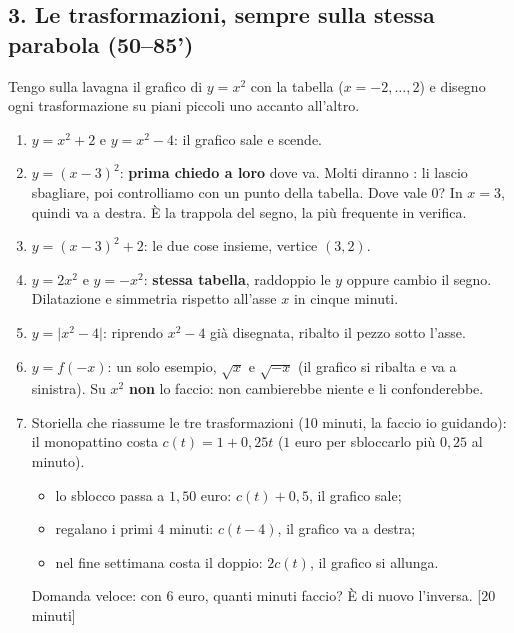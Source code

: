 \documentclass[11pt]{report}
\begin{document}
\subsection*{3. Le trasformazioni, sempre sulla stessa parabola (50--85')}
Tengo sulla lavagna il grafico di $y=x^2$ con la tabella ($x=-2,\dots,2$) e disegno ogni trasformazione su piani piccoli uno accanto all'altro.
\begin{enumerate}
  \item $y=x^2+2$ e $y=x^2-4$: il grafico sale e scende.
  \item $y=(x-3)^2$: \textbf{prima chiedo a loro} dove va. Molti diranno : li lascio sbagliare, poi controlliamo con un punto della tabella. Dove vale $0$? In $x=3$, quindi va a destra. È la trappola del segno, la più frequente in verifica.
  \item $y=(x-3)^2+2$: le due cose insieme, vertice $(3,2)$.
  \item $y=2x^2$ e $y=-x^2$: \textbf{stessa tabella}, raddoppio le $y$ oppure cambio il segno. Dilatazione e simmetria rispetto all'asse $x$ in cinque minuti.
  \item $y=\lvert x^2-4\rvert$: riprendo $x^2-4$ già disegnata, ribalto il pezzo sotto l'asse.
  \item $y=f(-x)$: un solo esempio, $\sqrt x$ e $\sqrt{-x}$ (il grafico si ribalta e va a sinistra). Su $x^2$ \textbf{non} lo faccio: non cambierebbe niente e li confonderebbe.
  \item Storiella che riassume le tre trasformazioni (10 minuti, la faccio io guidando): il monopattino costa $c(t)=1+0{,}25t$ ($1$ euro per sbloccarlo più $0{,}25$ al minuto).
  \begin{itemize}
    \item lo sblocco passa a $1{,}50$ euro: $c(t)+0{,}5$, il grafico sale;
    \item regalano i primi $4$ minuti: $c(t-4)$, il grafico va a destra;
    \item nel fine settimana costa il doppio: $2c(t)$, il grafico si allunga.
  \end{itemize}
  Domanda veloce: con $6$ euro, quanti minuti faccio? È di nuovo l'inversa. [$20$ minuti]
\end{enumerate}
\end{document}
